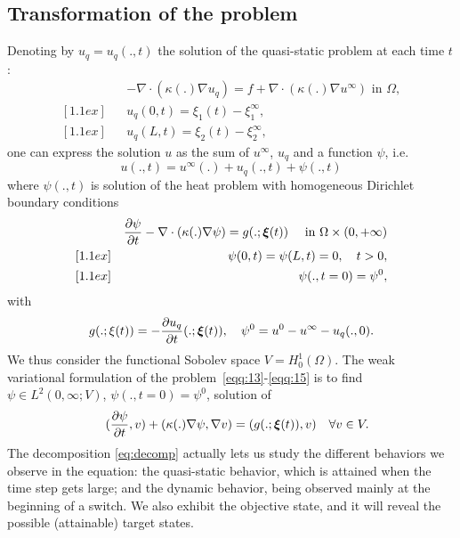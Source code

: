 \subsection{Transformation of the problem}
%
Denoting by $u_q=u_q(.,t)$ the solution of the quasi-static problem at each time $t$:
%
\begin{eqnarray}
&&  - \nabla\cdot(\kappa(.)\nabla u_q) = f+\nabla\cdot(\kappa(.)\nabla u^\infty) \mbox{ in } \Omega, 
\label{eq:9}\\ [1.1ex]
&& u_q(0,t) = \xi_1(t)-\xi_1^\infty,  \\ [1.1ex]
&& u_q(L,t) = \xi_2(t)-\xi_2^\infty, 
\label{eq:11}
\end{eqnarray}
%
one can express the solution $u$ as the sum of $u^\infty$, $u_q$ and a function $\psi$, i.e.
%
\begin{equation}
u(.,t) = u^\infty(.) + u_q(.,t) + \psi(.,t)
\label{eq:decomp}
\end{equation}
%
where $\psi(.,t)$ is solution of the heat problem with homogeneous Dirichlet boundary conditions
%
\begin{eqnarray}
&& \frac{\partial \psi}{\partial t} - \nabla\cdot(\kappa(.)\nabla \psi) = g(.;\bm{\xi}(t))
\label{eqq:13}
\quad \mbox{ in } \Omega\times (0,+\infty) \\ [1.1ex]
&& \psi(0,t) = \psi(L,t) = 0, \quad t>0, \\ [1.1ex]
&& \psi(.,t=0) = \psi^0, \label{eqq:15}
\end{eqnarray}
%
with
\[
g(.;\xi(t)) = -\frac{\partial u_q}{\partial t}(.;\bm{\xi}(t)),
\quad \psi^0 = u^0 -u^\infty - u_q(.,0).
\]
We thus consider the functional Sobolev space $V=H^1_0(\Omega)$.
The weak variational formulation of the problem~\eqref{eqq:13}-\eqref{eqq:15} is to find $\psi\in L^2(0,\infty;V)$, $\psi(.,t=0) = \psi^0$, solution of 
%
\begin{eqnarray}
&& (\frac{\partial \psi}{\partial t},v) + (\kappa(.)\nabla\psi,\nabla v)
= (g(.;\bm{\xi}(t)),v) \quad \forall v \in V. \label{eq:12}
\end{eqnarray}
The decomposition \eqref{eq:decomp} actually lets us study the different 
behaviors we observe in the equation: the quasi-static behavior, which is attained when 
the time step gets large; and the dynamic behavior, being observed mainly at the beginning 
of a switch. We also exhibit the objective state, and it will reveal the 
possible (attainable) target states.
%
